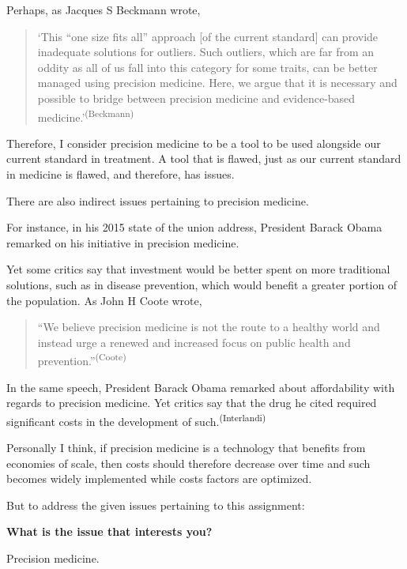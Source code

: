 Perhaps,  as Jacques S Beckmann wrote,
\begin{quotation}
`This ``one size fits all'' approach [of the current standard] can provide inadequate solutions for outliers. Such outliers, which are far from an oddity as all of us fall into this category for some traits, can be better managed using precision medicine. Here, we argue that it is necessary and possible to bridge between precision medicine and evidence-based medicine.'\textsuperscript{(Beckmann)}
\end{quotation}

Therefore, I consider precision medicine to be a tool to be used alongside our current standard in treatment. A tool that is flawed, just as our current standard in medicine is flawed, and therefore, has issues.

There are also indirect issues pertaining to precision medicine.

For instance, in his 2015 state of the union address, President Barack Obama remarked on his initiative in precision medicine.

Yet some critics say that investment would be better spent on more traditional solutions, such as in disease prevention, which would benefit a greater portion of the population. As John H Coote wrote,
\begin{quotation}
    ``We believe precision medicine is not the route to a healthy world and instead urge a renewed and increased focus on public health and prevention.''\textsuperscript{(Coote)}
\end{quotation}

In the same speech, President Barack Obama remarked about affordability with regards to precision medicine. Yet critics say that the drug he cited required significant costs in the development of such.\textsuperscript{(Interlandi)}

Personally I think, if precision medicine is a technology that benefits from economies of scale, then costs should therefore decrease over time and such becomes widely implemented while costs factors are optimized. 


But to address the given issues pertaining to this assignment:

\newcommand{\prompt}[2]{
    \textbf{{#1}}

    \hspace{10mm} {#2}\newline
}


\prompt{What is the issue that interests you?}{Precision medicine.}

